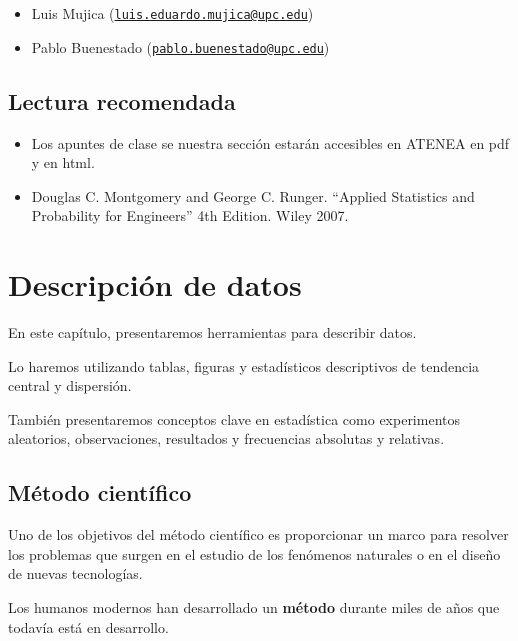 \documentclass[
]{book}
\providecommand{\tightlist}{%
  \setlength{\itemsep}{0pt}\setlength{\parskip}{0pt}}
\begin{document}
\begin{itemize}
\tightlist
\item
  Luis Mujica (\href{mailto:luis.eduardo.mujica@upc.edu}{\nolinkurl{luis.eduardo.mujica@upc.edu}})
\item
  Pablo Buenestado (\href{mailto:pablo.buenestado@upc.edu}{\nolinkurl{pablo.buenestado@upc.edu}})
\end{itemize}

\hypertarget{lectura-recomendada}{%
\section{Lectura recomendada}\label{lectura-recomendada}}

\begin{itemize}
\item
  Los apuntes de clase se nuestra sección estarán accesibles en ATENEA en pdf y en html.
\item
  Douglas C. Montgomery and George C. Runger. ``Applied Statistics and Probability for Engineers'' 4th Edition. Wiley 2007.
\end{itemize}

\hypertarget{descripciuxf3n-de-datos}{%
\chapter{Descripción de datos}\label{descripciuxf3n-de-datos}}

En este capítulo, presentaremos herramientas para describir datos.

Lo haremos utilizando tablas, figuras y estadísticos descriptivos de tendencia central y dispersión.

También presentaremos conceptos clave en estadística como experimentos aleatorios, observaciones, resultados y frecuencias absolutas y relativas.

\hypertarget{muxe9todo-cientuxedfico}{%
\section{Método científico}\label{muxe9todo-cientuxedfico}}

Uno de los objetivos del método científico es proporcionar un marco para resolver los problemas que surgen en el estudio de los fenómenos naturales o en el diseño de nuevas tecnologías.

Los humanos modernos han desarrollado un \textbf{método} durante miles de años que todavía está en desarrollo.
\end{document}
